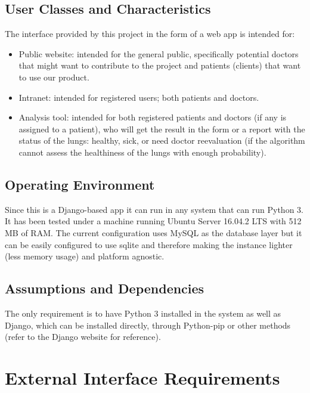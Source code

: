 \documentclass{scrreprt}
\begin{document}
\section{User Classes and Characteristics}
The interface provided by this project in the form of a web app is intended for:
\begin{itemize}
 \item Public website: intended for the general public, specifically potential doctors that might want to contribute to the project and patients (clients) that want to use our product.
 \item Intranet: intended for registered users; both patients and doctors.
 \item Analysis tool: intended for both registered patients and doctors (if any is assigned to a patient), who will get the result in the form or a report with the status of the lungs: healthy, sick, or need doctor reevaluation (if the algorithm cannot assess the healthiness of the lungs with enough probability).
\end{itemize}







\section{Operating Environment}

Since this is a Django-based app it can run in any system that can run Python 3. It has been tested under a machine running Ubuntu Server 16.04.2 LTS with 512 MB of RAM. The current configuration uses MySQL as the database layer but it can be easily configured to use sqlite and therefore making the instance lighter (less memory usage) and platform agnostic.

\section{Assumptions and Dependencies}

The only requirement is to have Python 3 installed in the system as well as Django, which can be installed directly, through Python-pip or other methods (refer to the Django website for reference).

\chapter{External Interface Requirements}
\end{document}
